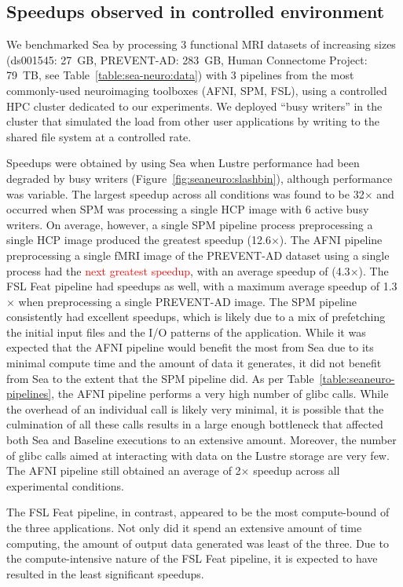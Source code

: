\documentclass[pdflatex,sn-mathphys-num]{sn-jnl}
\newcommand{\vhs}[1]{\textcolor{red}{#1}}
\theoremstyle{thmstyleone}%
\theoremstyle{thmstyletwo}%
\theoremstyle{thmstylethree}%
\begin{document}
\subsection{Speedups observed in controlled environment}

We benchmarked Sea by processing 3 functional MRI datasets of increasing sizes
(ds001545: 27~GB, PREVENT-AD: 283~GB, Human Connectome Project: 79~TB, see
Table~\ref{table:sea-neuro:data}) with 3 pipelines 
from the most commonly-used neuroimaging toolboxes (AFNI, SPM, FSL), using a controlled HPC cluster 
dedicated to our experiments. We deployed ``busy writers'' in the cluster
that simulated the load from other user applications by writing to the shared file system at a controlled rate.

Speedups were obtained by using Sea when Lustre
performance had been degraded by busy writers (Figure~\ref{fig:seaneuro:slashbin}),
although performance was variable. The largest speedup across all conditions
was found to be 32$\times$ and occurred when SPM was processing a single
HCP image with 6 active busy writers.
On average, however, a single SPM pipeline
process preprocessing a single HCP image produced the greatest speedup
(12.6$\times$). The AFNI pipeline preprocessing a single fMRI image of the PREVENT-AD dataset
using a single process had the \vhs{next greatest speedup}, with an average speedup of
(4.3$\times$). The FSL Feat pipeline had speedups as well, with a maximum average speedup of
1.3$\times$ when preprocessing a single PREVENT-AD image. The SPM pipeline consistently had
excellent speedups, which is likely due to a mix of prefetching the initial
input files and the I/O patterns of the application. While it was expected that the
AFNI pipeline would benefit the most from Sea due to its
minimal compute time and the amount of data it generates, it did not benefit
from Sea to the extent that the SPM pipeline did. As per Table~\ref{table:seaneuro-pipelines}, the
AFNI pipeline performs a very high number of glibc calls. While the overhead of an
individual call is likely very minimal, it is possible that the culmination of
all these calls results in a large enough bottleneck that affected both Sea and
Baseline executions to an extensive amount. Moreover, the number of glibc calls
aimed at interacting with data on the Lustre storage are very few. The AFNI pipeline still
obtained an average of 2$\times$ speedup across all experimental conditions.

The FSL Feat pipeline, in contrast, appeared to be the most compute-bound of the three
applications. Not only did it spend an extensive amount of time computing, the
amount of output data generated was least of the three. Due to the
compute-intensive nature of the FSL Feat pipeline, it is expected to have resulted in the
least significant speedups.
\end{document}
